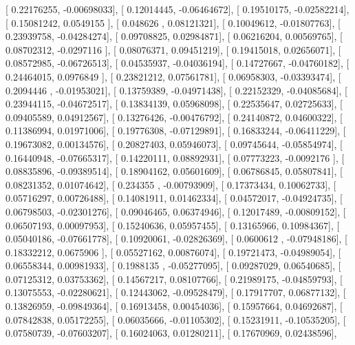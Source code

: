 \documentclass{article}
\begin{document}
       [ 0.22176255, -0.00698033],
       [ 0.12014445, -0.06464672],
       [ 0.19510175, -0.02582214],
       [ 0.15081242,  0.0549155 ],
       [ 0.048626  ,  0.08121321],
       [ 0.10049612, -0.01807763],
       [ 0.23939758, -0.04284274],
       [ 0.09708825,  0.02984871],
       [ 0.06216204,  0.00569765],
       [ 0.08702312, -0.0297116 ],
       [ 0.08076371,  0.09451219],
       [ 0.19415018,  0.02656071],
       [ 0.08572985, -0.06726513],
       [ 0.04535937, -0.04036194],
       [ 0.14727667, -0.04760182],
       [ 0.24464015,  0.0976849 ],
       [ 0.23821212,  0.07561781],
       [ 0.06958303, -0.03393474],
       [ 0.2094446 , -0.01953021],
       [ 0.13759389, -0.04971438],
       [ 0.22152329, -0.04085684],
       [ 0.23944115, -0.04672517],
       [ 0.13834139,  0.05968098],
       [ 0.22535647,  0.02725633],
       [ 0.09405589,  0.04912567],
       [ 0.13276426, -0.00476792],
       [ 0.24140872,  0.04600322],
       [ 0.11386994,  0.01971006],
       [ 0.19776308, -0.07129891],
       [ 0.16833244, -0.06411229],
       [ 0.19673082,  0.00134576],
       [ 0.20827403,  0.05946073],
       [ 0.09745644, -0.05854974],
       [ 0.16440948, -0.07665317],
       [ 0.14220111,  0.08892931],
       [ 0.07773223, -0.0092176 ],
       [ 0.08835896, -0.09389514],
       [ 0.18904162,  0.05601609],
       [ 0.06786845,  0.05807841],
       [ 0.08231352,  0.01074642],
       [ 0.234355  , -0.00793909],
       [ 0.17373434,  0.10062733],
       [ 0.05716297,  0.00726488],
       [ 0.14081911,  0.01462334],
       [ 0.04572017, -0.04924735],
       [ 0.06798503, -0.02301276],
       [ 0.09046465,  0.06374946],
       [ 0.12017489, -0.00809152],
       [ 0.06507193,  0.00097953],
       [ 0.15240636,  0.05957455],
       [ 0.13165966,  0.10984367],
       [ 0.05040186, -0.07661778],
       [ 0.10920061, -0.02826369],
       [ 0.0600612 , -0.07948186],
       [ 0.18332212,  0.0675906 ],
       [ 0.05527162,  0.00876074],
       [ 0.19721473, -0.04989054],
       [ 0.06558344,  0.00981933],
       [ 0.1988135 , -0.05277095],
       [ 0.09287029,  0.06540685],
       [ 0.07125312,  0.03753362],
       [ 0.14567217,  0.08107766],
       [ 0.21989175, -0.04859793],
       [ 0.13075553, -0.02280621],
       [ 0.12443062, -0.09528479],
       [ 0.17917707,  0.06877132],
       [ 0.13826959, -0.09849364],
       [ 0.16913458,  0.00454036],
       [ 0.15957664,  0.04692687],
       [ 0.07842838,  0.05172255],
       [ 0.06035666, -0.01105302],
       [ 0.15231911, -0.10535205],
       [ 0.07580739, -0.07603207],
       [ 0.16024063,  0.01280211],
       [ 0.17670969,  0.02438596],
\end{document}
